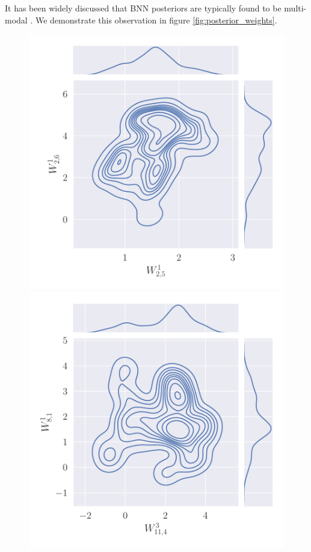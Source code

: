 It has been widely discussed that BNN posteriors are typically found to be multi-modal \cite{google_bnn_posteriors}. We demonstrate this observation in figure \ref{fig:posterior_weights}. 
\begin{figure}[H]
    \centering
    \includegraphics[scale=0.4]{figures/posterior_distribution/posterior_weights_0.pdf}
    \includegraphics[scale=0.4]{figures/posterior_distribution/posterior_weights_1.pdf}

\end{figure}
